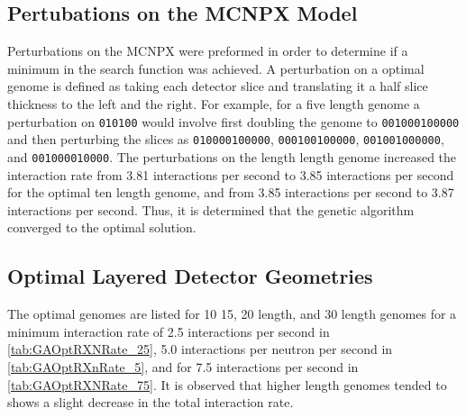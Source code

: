 \subsection{Pertubations on the MCNPX Model}
Perturbations on the MCNPX were preformed in order to determine if a minimum in the search function was achieved.
A perturbation on a optimal genome is defined as taking each detector slice and translating it a half slice thickness to the left and the right. 
For example, for a five length genome a perturbation on \verb+010100+ would involve first doubling the genome to  \verb+001000100000+ and then perturbing the slices as  \verb+010000100000+, \verb+000100100000+, \verb+001001000000+, and \verb+001000010000+.
The perturbations on the length length genome increased the interaction rate from 3.81 interactions per second to 3.85 interactions per second for the optimal ten length genome, and from 3.85 interactions per second to 3.87 interactions per second.
Thus, it is determined that the genetic algorithm converged to the optimal solution.

\subsection{Optimal Layered Detector Geometries}
The optimal genomes are listed for 10 15, 20 length, and 30 length genomes for a minimum interaction rate of 2.5 interactions per second in \autoref{tab:GAOptRXNRate_25}, 5.0 interactions per neutron per second in \autoref{tab:GAOptRXnRate_5}, and for 7.5 interactions per second in \autoref{tab:GAOptRXNRate_75}.
It is observed that higher length genomes tended to shows a slight decrease in the total interaction rate.


